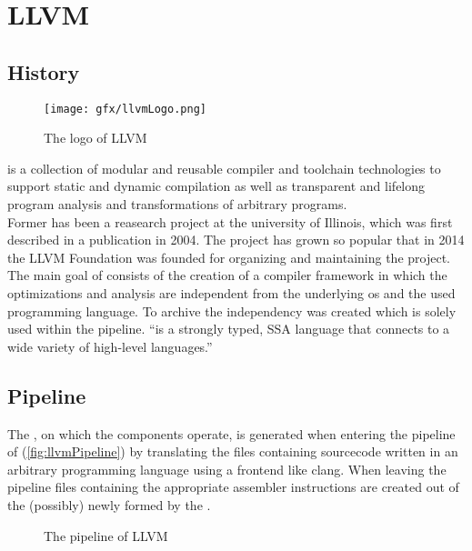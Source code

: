 \chapter{LLVM}
\section{History}
\begin{wrapfigure}{l}{.5\textwidth}
    \caption[The logo of LLVM]{The logo of LLVM \cite{llvmLogo}}
    \texttt{[image: gfx/llvmLogo.png]}
\end{wrapfigure}
\llvm is a collection of modular and reusable compiler and toolchain technologies to support static and dynamic compilation as well as transparent and lifelong program analysis and transformations of arbitrary programs. \cite{LLVMWebsite, LLVMResearchBeginning}\\
Former \llvm has been a reasearch project at the university of Illinois, which was first described in a publication in 2004.
The project has grown so popular that in 2014 the LLVM Foundation was founded for organizing and maintaining the project. \cite{LLVMFoundation}\\
The main goal of \llvm consists of the creation of a compiler framework in which the optimizations and analysis are independent from the underlying os and the used programming language.
To archive the independency \llvmir was created which is solely used within the pipeline.
\enquote{\llvmir is a strongly typed, \ac{SSA} language that connects to a wide variety of high-level languages.} \cite{PolyhedralEmpiricalStudy}

\section{Pipeline}
The \llvmir, on which the components operate, is generated when entering the pipeline of \llvm (\autoref{fig:llvmPipeline}) by translating the files containing sourcecode written in an arbitrary programming language using a frontend like clang.
When leaving the pipeline files containing the appropriate assembler instructions are created out of the (possibly) newly formed \llvmir by the \generator. \cite{IntroLLVM}
\begin{figure}[!ht]
    \caption{The pipeline of LLVM}
    \label{fig:llvmPipeline}
    \centering
    \legend
\end{figure}\\
